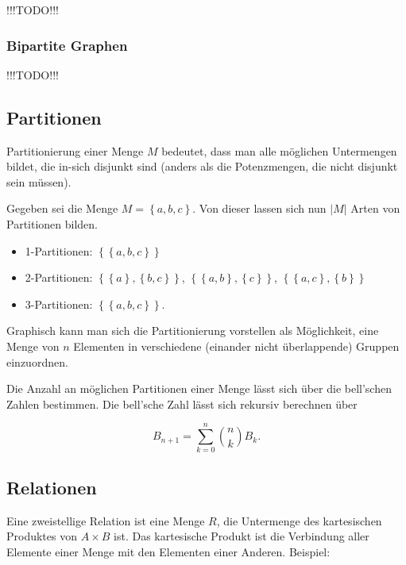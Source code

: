 \documentclass{scrartcl}
\newcommand{\TODO}{%
{\Huge\textcolor{HeavyRed}{\danger !!!TODO!!! \danger}}%
}
\begin{document}
\TODO

\subsubsection{Bipartite Graphen}

\TODO

\subsection{Partitionen}

Partitionierung einer Menge $M$ bedeutet, dass man alle möglichen Untermengen
bildet, die in-sich disjunkt sind (anders als die Potenzmengen, die nicht
disjunkt sein müssen).

Gegeben sei die Menge $M = \left\{a, b, c\right\}$. Von dieser lassen sich nun $|M|$ Arten von Partitionen bilden.

\begin{itemize}
	\item 1-Partitionen: $\left\{\left\{a, b, c\right\}\right\}$

	\item 2-Partitionen: $\left\{\left\{a\right\}, \left\{b, c\right\}\right\}$,
		$\left\{\left\{a, b\right\}, \left\{ c\right\}\right\}$,
		$\left\{\left\{a, c\right\}, \left\{b\right\}\right\}$
	\item 3-Partitionen: $\left\{\left\{a, b, c\right\}\right\}$.
\end{itemize}

Graphisch kann man sich die Partitionierung vorstellen als Möglichkeit, eine Menge
von $n$ Elementen in verschiedene (einander nicht überlappende) Gruppen einzuordnen.

Die Anzahl an möglichen Partitionen einer Menge lässt sich über die bell'schen Zahlen bestimmen. Die bell'sche Zahl lässt sich rekursiv berechnen über

\begin{equation}
	B_{n + 1} = \sum_{k = 0}^n \binom{n}{k} B_k.
\end{equation}


\subsection{Relationen}

Eine zweistellige Relation ist eine Menge $R$, die Untermenge des 
kartesischen Produktes von 
$A \times B$ ist. Das kartesische Produkt ist die Verbindung aller Elemente einer 
Menge mit den Elementen einer Anderen. Beispiel:
\end{document}
